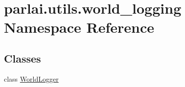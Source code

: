 \hypertarget{namespaceparlai_1_1utils_1_1world__logging}{}\section{parlai.\+utils.\+world\+\_\+logging Namespace Reference}
\label{namespaceparlai_1_1utils_1_1world__logging}
\subsection*{Classes}
\begin{DoxyCompactItemize}
\item 
class \hyperlink{classparlai_1_1utils_1_1world__logging_1_1WorldLogger}{World\+Logger}
\end{DoxyCompactItemize}
